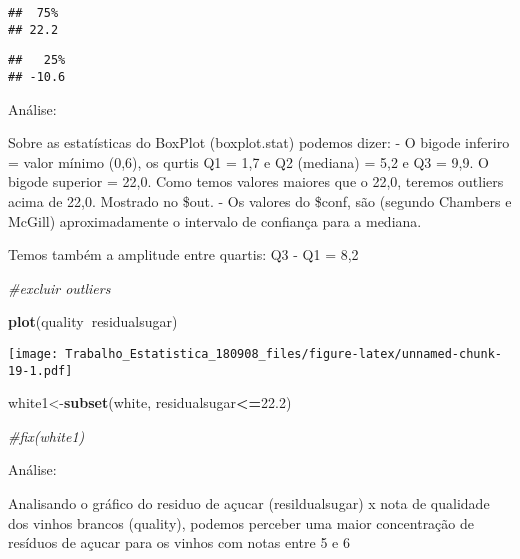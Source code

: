 \documentclass[]{article}
\newenvironment{Shaded}{\begin{snugshade}}{\end{snugshade}}
\newcommand{\KeywordTok}[1]{\textcolor[rgb]{0.13,0.29,0.53}{\textbf{#1}}}
\newcommand{\DataTypeTok}[1]{\textcolor[rgb]{0.13,0.29,0.53}{#1}}
\newcommand{\DecValTok}[1]{\textcolor[rgb]{0.00,0.00,0.81}{#1}}
\newcommand{\FloatTok}[1]{\textcolor[rgb]{0.00,0.00,0.81}{#1}}
\newcommand{\StringTok}[1]{\textcolor[rgb]{0.31,0.60,0.02}{#1}}
\newcommand{\CommentTok}[1]{\textcolor[rgb]{0.56,0.35,0.01}{\textit{#1}}}
\newcommand{\OperatorTok}[1]{\textcolor[rgb]{0.81,0.36,0.00}{\textbf{#1}}}
\newcommand{\NormalTok}[1]{#1}
\begin{document}
\begin{verbatim}
##  75% 
## 22.2
\end{verbatim}

\begin{Shaded}
\end{Shaded}

\begin{verbatim}
##   25% 
## -10.6
\end{verbatim}

Análise:

Sobre as estatísticas do BoxPlot (boxplot.stat) podemos dizer: - O
bigode inferiro = valor mínimo (0,6), os qurtis Q1 = 1,7 e Q2 (mediana)
= 5,2 e Q3 = 9,9. O bigode superior = 22,0. Como temos valores maiores
que o 22,0, teremos outliers acima de 22,0. Mostrado no \$out. - Os
valores do \$conf, são (segundo Chambers e McGill) aproximadamente o
intervalo de confiança para a mediana.

Temos também a amplitude entre quartis: Q3 - Q1 = 8,2

\begin{Shaded}
\begin{Highlighting}[]
\CommentTok{#excluir outliers}

\KeywordTok{plot}\NormalTok{(quality}\OperatorTok{~}\NormalTok{residualsugar)}
\end{Highlighting}
\end{Shaded}

\texttt{[image: Trabalho\_Estatistica\_180908\_files/figure-latex/unnamed-chunk-19-1.pdf]}

\begin{Shaded}
\begin{Highlighting}[]
\NormalTok{white1<-}\KeywordTok{subset}\NormalTok{(white, residualsugar}\OperatorTok{<=}\FloatTok{22.2}\NormalTok{)   }

\CommentTok{#fix(white1)}
\end{Highlighting}
\end{Shaded}

Análise:

Analisando o gráfico do residuo de açucar (resildualsugar) x nota de
qualidade dos vinhos brancos (quality), podemos perceber uma maior
concentração de resíduos de açucar para os vinhos com notas entre 5 e 6
\end{document}
